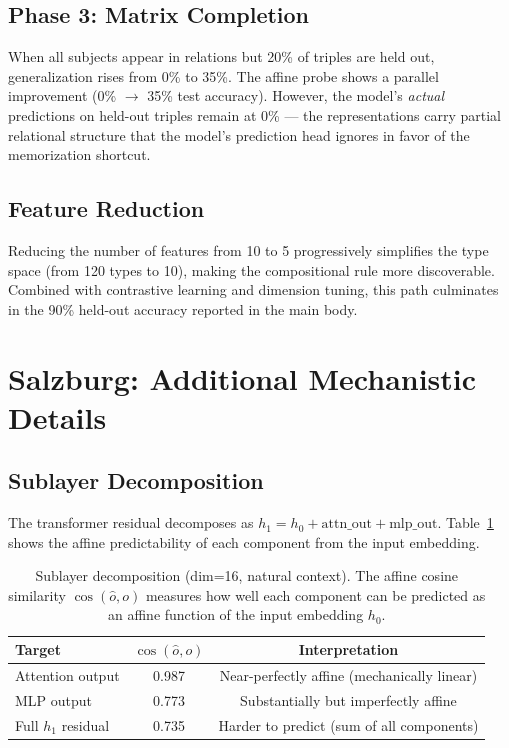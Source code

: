 \documentclass[11pt]{article}
\begin{document}
\subsection{Phase 3: Matrix Completion}

When all subjects appear in relations but 20\% of triples are held out, generalization
rises from 0\% to 35\%. The affine probe shows a parallel improvement (0\% $\to$
35\% test accuracy). However, the model's \emph{actual} predictions on held-out triples
remain at 0\% --- the representations carry partial relational structure that the
model's prediction head ignores in favor of the memorization shortcut.

\subsection{Feature Reduction}

Reducing the number of features from 10 to 5 progressively simplifies the type space
(from 120 types to 10), making the compositional rule more discoverable. Combined with
contrastive learning and dimension tuning, this path culminates in the 90\% held-out
accuracy reported in the main body.

\section{Salzburg: Additional Mechanistic Details}
\label{app:salzburg_mech}

\subsection{Sublayer Decomposition}

The transformer residual decomposes as $h_1 = h_0 + \text{attn\_out} + \text{mlp\_out}$.
Table~\ref{tab:sublayer} shows the affine predictability of each component from the
input embedding.

\begin{table}[h]
\centering
\caption{Sublayer decomposition (dim=16, natural context). The affine cosine similarity
$\cos(\hat{o}, o)$ measures how well each component can be predicted as an affine
function of the input embedding $h_0$.}
\label{tab:sublayer}
\begin{tabular}{lcc}
\toprule
Target & $\cos(\hat{o}, o)$ & Interpretation \\
\midrule
Attention output & 0.987 & Near-perfectly affine (mechanically linear) \\
MLP output & 0.773 & Substantially but imperfectly affine \\
Full $h_1$ residual & 0.735 & Harder to predict (sum of all components) \\
\bottomrule
\end{tabular}
\end{table}
\end{document}
